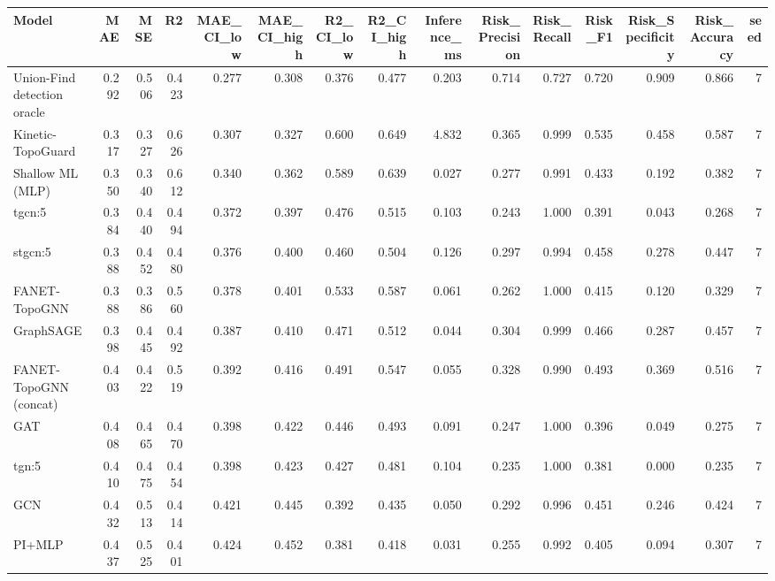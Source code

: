 \begin{tabular}{lrrrrrrrrrrrrrr}
\toprule
Model & MAE & MSE & R2 & MAE\_CI\_low & MAE\_CI\_high & R2\_CI\_low & R2\_CI\_high & Inference\_ms & Risk\_Precision & Risk\_Recall & Risk\_F1 & Risk\_Specificity & Risk\_Accuracy & seed \\
\midrule
Union-Find detection oracle & 0.292 & 0.506 & 0.423 & 0.277 & 0.308 & 0.376 & 0.477 & 0.203 & 0.714 & 0.727 & 0.720 & 0.909 & 0.866 & 7 \\
Kinetic-TopoGuard & 0.317 & 0.327 & 0.626 & 0.307 & 0.327 & 0.600 & 0.649 & 4.832 & 0.365 & 0.999 & 0.535 & 0.458 & 0.587 & 7 \\
Shallow ML (MLP) & 0.350 & 0.340 & 0.612 & 0.340 & 0.362 & 0.589 & 0.639 & 0.027 & 0.277 & 0.991 & 0.433 & 0.192 & 0.382 & 7 \\
tgcn:5 & 0.384 & 0.440 & 0.494 & 0.372 & 0.397 & 0.476 & 0.515 & 0.103 & 0.243 & 1.000 & 0.391 & 0.043 & 0.268 & 7 \\
stgcn:5 & 0.388 & 0.452 & 0.480 & 0.376 & 0.400 & 0.460 & 0.504 & 0.126 & 0.297 & 0.994 & 0.458 & 0.278 & 0.447 & 7 \\
FANET-TopoGNN & 0.388 & 0.386 & 0.560 & 0.378 & 0.401 & 0.533 & 0.587 & 0.061 & 0.262 & 1.000 & 0.415 & 0.120 & 0.329 & 7 \\
GraphSAGE & 0.398 & 0.445 & 0.492 & 0.387 & 0.410 & 0.471 & 0.512 & 0.044 & 0.304 & 0.999 & 0.466 & 0.287 & 0.457 & 7 \\
FANET-TopoGNN (concat) & 0.403 & 0.422 & 0.519 & 0.392 & 0.416 & 0.491 & 0.547 & 0.055 & 0.328 & 0.990 & 0.493 & 0.369 & 0.516 & 7 \\
GAT & 0.408 & 0.465 & 0.470 & 0.398 & 0.422 & 0.446 & 0.493 & 0.091 & 0.247 & 1.000 & 0.396 & 0.049 & 0.275 & 7 \\
tgn:5 & 0.410 & 0.475 & 0.454 & 0.398 & 0.423 & 0.427 & 0.481 & 0.104 & 0.235 & 1.000 & 0.381 & 0.000 & 0.235 & 7 \\
GCN & 0.432 & 0.513 & 0.414 & 0.421 & 0.445 & 0.392 & 0.435 & 0.050 & 0.292 & 0.996 & 0.451 & 0.246 & 0.424 & 7 \\
PI+MLP & 0.437 & 0.525 & 0.401 & 0.424 & 0.452 & 0.381 & 0.418 & 0.031 & 0.255 & 0.992 & 0.405 & 0.094 & 0.307 & 7 \\
\bottomrule
\end{tabular}